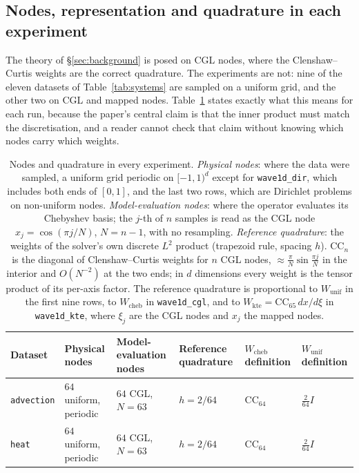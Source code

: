 \documentclass[11pt]{article}
\theoremstyle{definition}
\theoremstyle{remark}
\newcommand{\Wc}{W_{\mathrm{cheb}}}
\newcommand{\Wu}{W_{\mathrm{unif}}}
\begin{document}
\subsection{Nodes, representation and quadrature in each experiment}
\label{sec:nodes}

The theory of \S\ref{sec:background} is posed on CGL nodes, where the
Clenshaw--Curtis weights are the correct quadrature. The experiments are not:
nine of the eleven datasets of Table~\ref{tab:systems} are sampled on a uniform
grid, and the other two on CGL and mapped nodes.
Table~\ref{tab:nodes} states exactly what this means for each run, because the
paper's central claim is that the inner product must match the discretisation,
and a reader cannot check that claim without knowing which nodes carry which
weights.

\begin{table}[htbp]
\centering
\caption{Nodes and quadrature in every experiment. \emph{Physical nodes}: where
the data were sampled, a uniform grid periodic on $[-1,1)^d$ except for
\texttt{wave1d\_dir}, which includes both ends of $[0,1]$, and the last two rows,
which are Dirichlet problems on non-uniform nodes. \emph{Model-evaluation
nodes}: where the operator evaluates its Chebyshev basis; the $j$-th of $n$
samples is read as the CGL node $x_j=\cos(\pi j/N)$, $N=n-1$, with no
resampling. \emph{Reference quadrature}: the weights of the solver's own discrete
$L^2$ product (trapezoid rule, spacing $h$). $\mathrm{CC}_n$ is the diagonal of
Clenshaw--Curtis weights for $n$ CGL nodes, $\approx\frac{\pi}{N}\sin\frac{\pi j}{N}$
in the interior and $O(N^{-2})$ at the two ends; in $d$ dimensions every weight
is the tensor product of its per-axis factor. The reference quadrature is
proportional to $\Wu$ in the first nine rows, to $\Wc$ in \texttt{wave1d\_cgl}, and
to $W_{\mathrm{kte}}=\mathrm{CC}_{65}\,dx/d\xi$ in \texttt{wave1d\_kte}, where
$\xi_j$ are the CGL nodes and $x_j$ the mapped nodes.}
\label{tab:nodes}
\footnotesize
\setlength{\tabcolsep}{2pt}
\begin{tabular}{@{}llllll@{}}
\toprule
Dataset & Physical nodes & Model-evaluation nodes & Reference quadrature & $\Wc$ definition & $\Wu$ definition \\
\midrule
\texttt{advection}  & $64$ uniform, periodic & $64$ CGL, $N=63$ & $h=2/64$ & $\mathrm{CC}_{64}$ & $\tfrac{2}{64}I$ \\
\texttt{heat}       & $64$ uniform, periodic & $64$ CGL, $N=63$ & $h=2/64$ & $\mathrm{CC}_{64}$ & $\tfrac{2}{64}I$ \\

\end{tabular}
\end{table}
\end{document}
